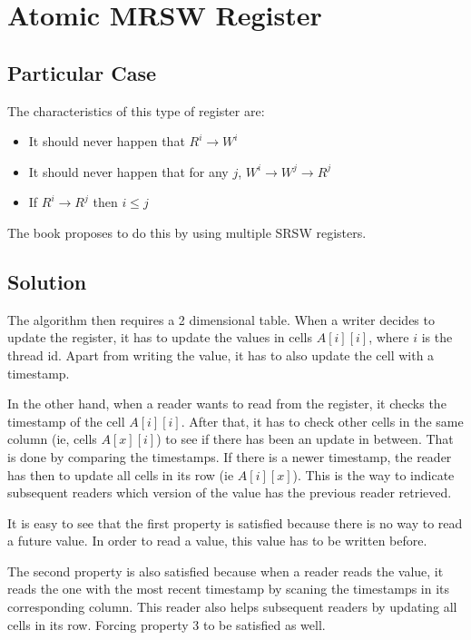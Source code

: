 \section{\textbf{Atomic MRSW Register}}
\subsection{Particular Case}
\par
The characteristics of this type of register are:
\begin{itemize}
\item It should never happen that $R^{i} \rightarrow W^{i}$
\item It should never happen that for any ${j}$, ${W^{i} \rightarrow W^{j} \rightarrow R^{j}}$
\item If ${R^{i} \rightarrow R^{j}}$ then ${i \leq j}$
\end{itemize}
The book proposes to do this by using multiple SRSW registers.
\subsection{Solution}
The algorithm then requires a 2 dimensional table. When a writer decides to
update the register, it has to update the values in cells $A[i][i]$, where $i$
is the thread id. Apart from writing the value, it has to also update the cell
with a timestamp. 
\par
In the other hand, when a reader wants to read from the register, it checks the
timestamp of the cell $A[i][i]$. After that, it has to check other cells in the
same column (ie, cells $A[x][i]$) to see if there has been an update in between.
That is done by comparing the timestamps. If there is a newer timestamp, the
reader has then to update all cells in its row (ie $A[i][x]$). This is the way
to indicate subsequent readers which version of the value has the previous
reader retrieved.
\par
It is easy to see that the first property is satisfied because there is no way
to read a future value. In order to read a value, this value has to be written
before.
\par
The second property is also satisfied because when a reader reads the value, it
reads the one with the most recent timestamp by scaning the timestamps in its
corresponding column. This reader also helps subsequent readers by updating all
cells in its row. Forcing property 3 to be satisfied as well.
\par
